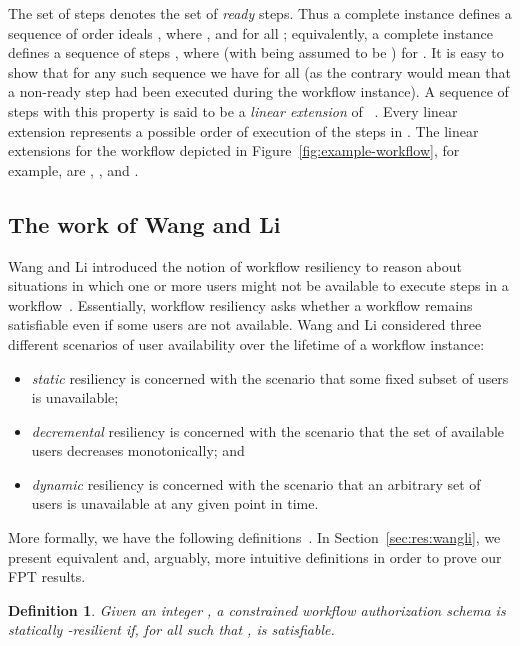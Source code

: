 \documentclass[jcs,crcready]{iosart1c}
\newtheorem{df}{Definition}
\begin{document}
The set of steps  denotes the set of \emph{ready} steps.  
Thus a complete instance defines a sequence of order ideals , where ,  and  for all ; equivalently, a complete instance defines a sequence of steps , where  (with  being assumed to be ) for . 
It is easy to show that for any such sequence we have  for all  (as the contrary would mean that a non-ready step had been executed during the workflow instance).  
A sequence of steps with this property is said to be a \emph{linear extension} of ~\cite{DaPr02}. 
Every linear extension represents a possible order of execution of the steps in .
The linear extensions for the workflow depicted in Figure~\ref{fig:example-workflow}, for example, are , , and .


\subsection{The work of Wang and Li}

Wang and Li introduced the notion of workflow resiliency to reason about situations in which one or more users might not be available to execute steps in a workflow~\cite{WaLi10}.
Essentially, workflow resiliency asks whether a workflow remains satisfiable even if some users are not available.
Wang and Li considered three different scenarios of user availability over the lifetime of a workflow instance:
 \begin{itemize}
  \item \emph{static} resiliency is concerned with the scenario that some fixed subset of users is unavailable;
  \item \emph{decremental} resiliency is concerned with the scenario that the set of available users decreases monotonically; and
  \item \emph{dynamic} resiliency is concerned with the scenario that an arbitrary set of users is unavailable at any given point in time.
 \end{itemize}
More formally, we have the following definitions~\cite{WaLi10}.
In Section~\ref{sec:res:wangli}, we present equivalent and, arguably, more intuitive definitions in order to prove our FPT results.
 
\begin{df}
Given an integer , a constrained workflow authorization schema  is {\em statically -resilient} if, for all  such that ,  is satisfiable.
\end{df} 
\end{document}

